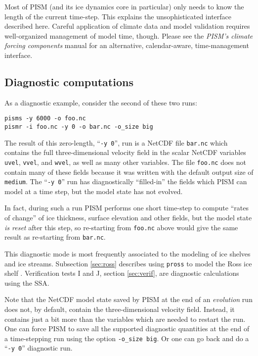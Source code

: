 Most of PISM (and its ice dynamics core in particular) only needs to know the length of the current time-step. This explains the unsophisticated interface described here. Careful application of climate data and model validation requires well-organized management of model time, though. Please see the \emph{PISM's climate forcing components} manual for an alternative, calendar-aware, time-management interface.

\subsection{Diagnostic computations}
\label{sec:diagnostic-computations}

 As a diagnostic example, consider the second of these two runs:
\begin{verbatim}
pisms -y 6000 -o foo.nc
pismr -i foo.nc -y 0 -o bar.nc -o_size big
\end{verbatim}

\noindent The result of this zero-length, ``\texttt{-y 0}'', run is a NetCDF file \texttt{bar.nc} which contains the full three-dimensional velocity field in the scalar NetCDF variables \texttt{uvel}, \texttt{vvel}, and \texttt{wvel}, as well as many other variables.  The file \texttt{foo.nc} does not contain many of these fields because it was written with the default output size of \texttt{medium}.  The ``\texttt{-y 0}'' run has diagnostically ``filled-in'' the fields which PISM can model at a time step, but the model state has not evolved.

In fact, during such a run PISM performs one short time-step to compute ``rates of change'' of ice thickness, surface elevation and other fields, but the model state \emph{is reset} after this step, so re-starting from \texttt{foo.nc} above would give the same result as re-starting from \texttt{bar.nc}.

This diagnostic mode is most frequently associated to the modeling of ice shelves and ice streams.  Subsection \ref{sec:ross} describes using \texttt{pross} to model the Ross ice shelf \cite{MacAyealetal}.  Verification tests I and J, section \ref{sec:verif}, are diagnostic calculations using the SSA.

Note that the NetCDF model state saved by PISM at the end of an \emph{evolution} run does not, by default, contain the three-dimensional velocity field.  Instead, it contains just a bit more than the variables which are needed to restart the run.  One can  force PISM to save all the supported diagnostic quantities at the end of a time-stepping run using the option \texttt{-o_size big}.  Or one can go back and do a ``\texttt{-y 0}'' diagnostic run.


